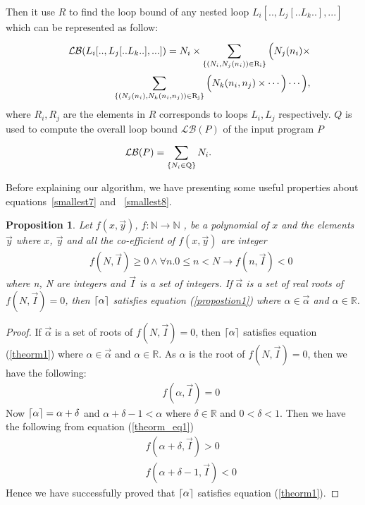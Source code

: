 \documentclass{article}
\DeclarePairedDelimiter\ceil{\lceil}{\rceil}
\newtheorem{prop}{Proposition}
\begin{document}
Then it use $R$ to find the loop bound of any nested loop $L_{i}[..,L_j[..L_k..],...]$ which can be represented as follow:
\begin{eqnarray}
&&\hspace*{-4em}\mathcal{LB}(L_{i}[..,L_j[..L_k..],...]) = N_i \times \sum_{\{(N_i,N_j(n_i)) \in  \mathrm{R_i}\}}^{} \Big( N_j(n_i) \times\nonumber \\
&&\hspace*{5em} \sum_{\{(N_j(n_i),N_k(n_i,n_j)) \in  \mathrm{R_j}\}}^{} \Big( N_k(n_i,n_j) \times \cdots \Big)\cdots \Big) , \label{loopbound1}
\end{eqnarray}
where $R_i,R_j$ are the elements in $R$ corresponds to loops $L_i,L_j$ respectively. $Q$ is used to compute the overall loop bound $\mathcal{LB}(P)$ of the input program $P$
\begin{eqnarray}
&&\hspace*{-4em}\mathcal{LB}(P) = \sum_{\{N_i \in  \mathrm{Q}\}}^{} N_i. \label{loopbound2}
\end{eqnarray}

Before explaining our algorithm, we have presenting some useful properties about equations~\ref{smallest7} and ~\ref{smallest8}.


\begin{prop}\label{propostion2}
Let $f(x,\vec{y})$, $f:\mathbb{N}\rightarrow \mathbb{N}$ , be a polynomial of $x$ and the elements $\vec{y}$ where $x$, $\vec{y}$ and all the co-efficient of $f(x,\vec{y})$ are integer 
\begin{eqnarray}
	&&f(N,\vec{I})\geq 0 \land \forall n.0\leq n < N \rightarrow f(n,\vec{I})<0\label{theorm1} \label{theorm2}
\end{eqnarray}
where n, N are integers and $\vec{I}$ is a set of integers. If $\vec{\alpha}$ is a set of real roots of $f(N,\vec{I})=0$, then $\ceil*{\alpha}$ satisfies equation (\ref{propostion1})  where $\alpha \in \vec{\alpha}$ and $\alpha \in \mathbb{R}$. 
\end{prop}
\begin{proof}
If $\vec{\alpha}$ is a set of roots of $f(N,\vec{I})=0$, then $\ceil*{\alpha}$ satisfies equation (\ref{theorm1}) where $\alpha \in \vec{\alpha}$ and $\alpha \in \mathbb{R}$.
As $\alpha$ is the root of $f(N,\vec{I})=0$, then we have the following:
    \begin{eqnarray}
    &&f(\alpha,\vec{I})=0\label{theorm_eq1}
    \end{eqnarray}
Now $\ceil*{\alpha}=\alpha+\delta$ and $\alpha+\delta-1<\alpha$ where $\delta \in \mathbb{R}$ and $0<\delta<1$. Then we have the following from equation (\ref{theorm_eq1})
    \begin{eqnarray}
    &&f(\alpha+\delta,\vec{I})>0\label{theorm_eq2}\\
    &&f(\alpha+\delta-1,\vec{I})<0\label{theorm_eq3}
    \end{eqnarray}
Hence we have successfully proved that $\ceil*{\alpha}$ satisfies equation (\ref{theorm1}).
\end{proof}
\end{document}
